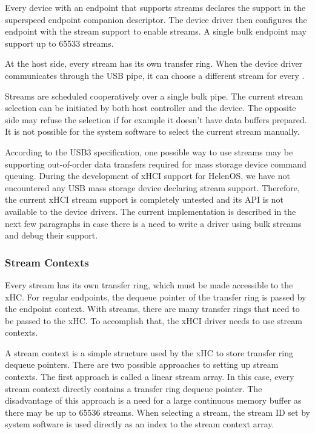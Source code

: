 Every device with an endpoint that supports streams declares the support in the
superspeed endpoint companion descriptor. The device driver then
configures the endpoint with the stream support to enable streams. A single
bulk endpoint may support up to 65533 streams.

At the host side, every stream has its own transfer ring. When the device
driver communicates through the USB pipe, it can choose a different stream for
every .

Streams are scheduled cooperatively over a single bulk pipe. The current stream
selection can be initiated by both host controller and the device. The opposite
side may refuse the selection if for example it doesn't have data buffers
prepared. It is not possible for the system software to select the current
stream manually.

According to the USB3 specification, one possible way to use streams may be
supporting out-of-order data transfers required for mass storage device command
queuing. During the development of xHCI support for HelenOS, we have not
encountered any USB mass storage device declaring stream support. Therefore,
the current xHCI stream support is completely untested and its API is not
available to the device drivers. The current implementation is described in the
next few paragraphs in case there is a need to write a driver using bulk
streams and debug their support.

\subsubsection{Stream Contexts}

Every stream has its own transfer ring, which must be made
accessible to the xHC. For regular endpoints, the dequeue pointer of the
transfer ring is passed by the endpoint context. With streams, there are many
transfer rings that need to be passed to the xHC. To accomplish that, the
xHCI driver needs to use stream contexts.

A stream context is a simple structure used by the xHC to store transfer ring
dequeue pointers. There are two possible approaches to setting up stream
contexts. The first approach is called a linear stream array. In this case,
every stream context directly contains a transfer ring dequeue pointer. The
disadvantage of this approach is a need for a large continuous memory buffer as
there may be up to 65536 streams. When selecting a stream, the stream ID set by
system software is used directly as an index to the stream context array.

